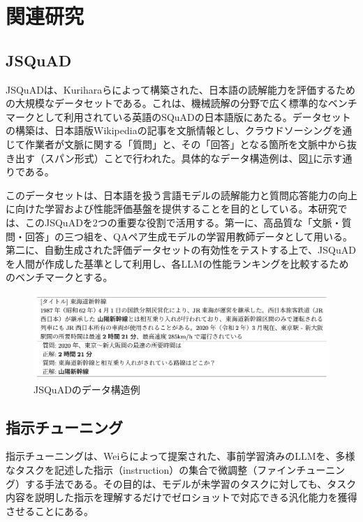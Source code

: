 \documentclass[twocolumn]{jsarticle}
\begin{document}
\section{関連研究}

\subsection{JSQuAD}
JSQuADは、Kuriharaら\cite{GLUE}によって構築された、日本語の読解能力を評価するための大規模なデータセットである。これは、機械読解の分野で広く標準的なベンチマークとして利用されている英語のSQuAD\cite{SQuAD}の日本語版にあたる。データセットの構築は、日本語版Wikipediaの記事を文脈情報とし、クラウドソーシングを通じて作業者が文脈に関する「質問」と、その「回答」となる箇所を文脈中から抜き出す（スパン形式）ことで行われた。具体的なデータ構造例は、図\ref{fig:jsquad_example}に示す通りである。

このデータセットは、日本語を扱う言語モデルの読解能力と質問応答能力の向上に向けた学習および性能評価基盤を提供することを目的としている。本研究では、このJSQuADを2つの重要な役割で活用する。第一に、高品質な「文脈・質問・回答」の三つ組を、QAペア生成モデルの学習用教師データとして用いる。第二に、自動生成された評価データセットの有効性をテストする上で、JSQuADを人間が作成した基準として利用し、各LLMの性能ランキングを比較するためのベンチマークとする。

\begin{figure}[t]
  \centering
  \includegraphics[width=\linewidth]{fig/jsquad.png}
  \caption{JSQuADのデータ構造例\cite{JGLUE}}
  \label{fig:jsquad_example}
\end{figure}

\subsection{指示チューニング}
指示チューニングは、Weiら\cite{Instruction-Tuning}によって提案された、事前学習済みのLLMを、多様なタスクを記述した指示（instruction）の集合で微調整（ファインチューニング）する手法である。その目的は、モデルが未学習のタスクに対しても、タスク内容を説明した指示を理解するだけでゼロショットで対応できる汎化能力を獲得させることにある。
\end{document}

